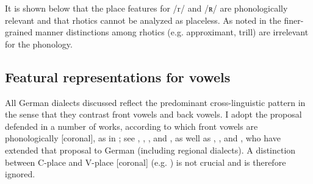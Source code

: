 
It is shown below that the place features for /r/ and /ʀ/ are phonologically relevant and that rhotics cannot be analyzed as placeless. As noted in  the finer-grained manner distinctions among rhotics (e.g. approximant, trill) are irrelevant for the phonology.

\subsection{Featural representations for vowels}\label{sec:2.2.3}

All German dialects discussed reflect the predominant cross-linguistic pattern in the sense that they contrast front vowels and back vowels. I adopt the proposal defended in a number of works, according to which front vowels are phonologically [coronal], as in ; see \citet{Clements1976}, \citet{LahiriEvers1991}, \citet{Hume1994}, and \citet{ClementsHume1995}, as well as \citet{Robinson2001}, \citet{Glover2014}, and \citet{Hall2014b}, who have extended that proposal to German (including regional dialects). A distinction between C-place and V-place [coronal] (e.g. \citealt{ClementsHume1995}) is not crucial and is therefore ignored.\largerpage

